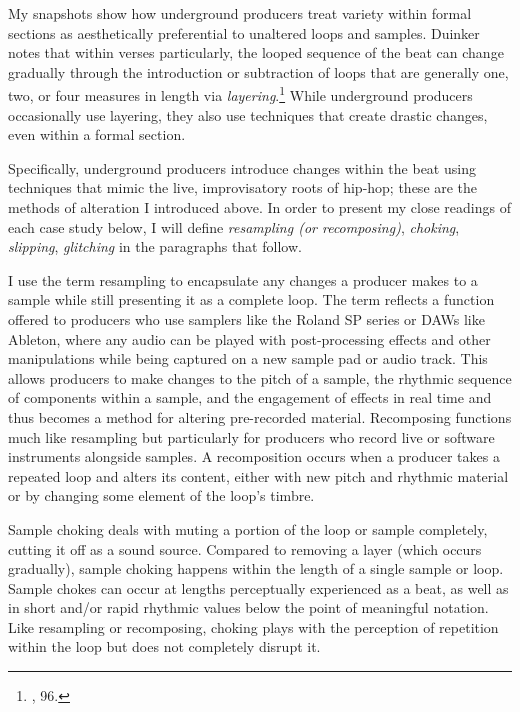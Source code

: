 My snapshots show how underground producers treat variety within formal sections as aesthetically
preferential to unaltered loops and samples. Duinker notes that within verses particularly, the 
looped sequence of the beat can change gradually through the introduction or subtraction of loops 
that are generally one, two, or four measures in length via \emph{layering}.\footnote{\cite{benduinkerSongFormMainstreaming2020}, 96.} While underground 
producers occasionally use layering, they also use techniques that create drastic changes, even 
within a formal section. 

Specifically, underground producers introduce changes within the beat using techniques that mimic
the live, improvisatory roots of hip-hop; these are the methods of alteration I introduced above. 
In order to present my close readings of each case study below, I will define \emph{resampling (or
recomposing)}, \emph{choking}, \emph{slipping}, \emph{glitching} in the paragraphs that follow.

I use the term resampling to encapsulate any changes a producer makes to a sample while still presenting
it as a complete loop. The term reflects a function offered to producers who use samplers like the Roland 
SP series or DAWs like Ableton, where any audio can be played with post-processing effects and other
manipulations while being captured on a new sample pad or audio track. This allows producers to make 
changes to the pitch of a sample, the rhythmic sequence of components within a sample, and the engagement
of effects in real time and thus becomes a method for altering pre-recorded material. Recomposing 
functions much like resampling but particularly for producers who record live or software instruments
alongside samples. A recomposition occurs when a producer takes a repeated loop and alters its content,
either with new pitch and rhythmic material or by changing some element of the loop's timbre. 

Sample choking deals with muting a portion of the loop or sample completely, cutting it off as a 
sound source. Compared to removing a layer (which occurs gradually), sample choking happens within 
the length of a single sample or loop. Sample chokes can occur at lengths perceptually experienced 
as a beat, as well as in short and/or rapid rhythmic values below the point of meaningful notation. 
Like resampling or recomposing, choking plays with the perception of repetition within the loop but 
does not completely disrupt it.

